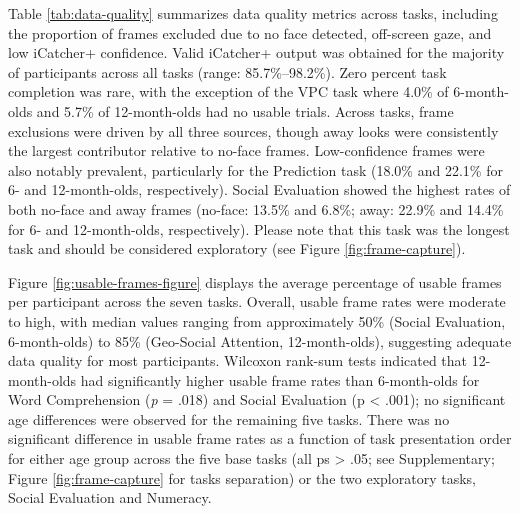 \documentclass[
  english,
  man,floatsintext]{apa6}
\begin{document}
Table \ref{tab:data-quality} summarizes data quality metrics across tasks, including the proportion of frames excluded due to no face detected, off-screen gaze, and low iCatcher+ confidence.
Valid iCatcher+ output was obtained for the majority of participants across all tasks (range: 85.7\%--98.2\%).
Zero percent task completion was rare, with the exception of the VPC task where 4.0\% of 6-month-olds and 5.7\% of 12-month-olds had no usable trials.
Across tasks, frame exclusions were driven by all three sources, though away looks were consistently the largest contributor relative to no-face frames.
Low-confidence frames were also notably prevalent, particularly for the Prediction task (18.0\% and 22.1\% for 6- and 12-month-olds, respectively).
Social Evaluation showed the highest rates of both no-face and away frames (no-face: 13.5\% and 6.8\%; away: 22.9\% and 14.4\% for 6- and 12-month-olds, respectively).
Please note that this task was the longest task and should be considered exploratory (see Figure \ref{fig:frame-capture}).

Figure \ref{fig:usable-frames-figure} displays the average percentage of usable frames per participant across the seven tasks.
Overall, usable frame rates were moderate to high, with median values ranging from approximately 50\% (Social Evaluation, 6-month-olds) to 85\% (Geo-Social Attention, 12-month-olds), suggesting adequate data quality for most participants.
Wilcoxon rank-sum tests indicated that 12-month-olds had significantly higher usable frame rates than 6-month-olds for Word Comprehension (\emph{p} = .018) and Social Evaluation (p \textless{} .001); no significant age differences were observed for the remaining five tasks.
There was no significant difference in usable frame rates as a function of task presentation order for either age group across the five base tasks (all ps \textgreater{} .05; see Supplementary; Figure \ref{fig:frame-capture} for tasks separation) or the two exploratory tasks, Social Evaluation and Numeracy.
\end{document}
